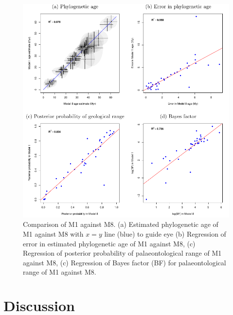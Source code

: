 \documentclass[11pt]{article}
\newcommand{\Mstrict}{{M1}}
\newcommand{\Mrelaxed}{{M8}}
\begin{document}
\begin{figure}
\includegraphics{Figure_comparison.pdf}
\caption{\label{fig:compareM1M8}
Comparison of \Mstrict{} against \Mrelaxed{}. (a) Estimated phylogenetic age of \Mstrict{} against \Mrelaxed{} with $x=y$ line (blue) to guide eye (b) Regression of error in estimated phylogenetic age of \Mstrict{} against \Mrelaxed{}, (c) Regression of posterior probability of palaeontological range of \Mstrict{} against \Mrelaxed{}, (c) Regression of Bayes factor (BF) for palaeontological range of \Mstrict{} against \Mrelaxed{}.}
\end{figure}






\section*{Discussion}
\end{document}
